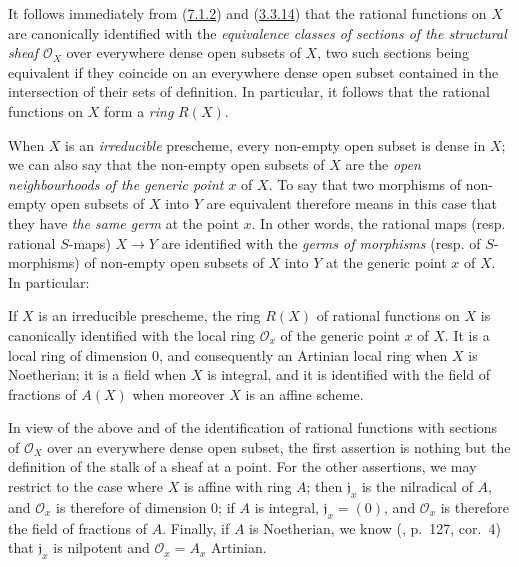 \begin{env}[7.1.3]
\label{I.7.1.3}
It follows immediately from (\hyperref[I.7.1.2]{7.1.2}) and
(\hyperref[I.3.3.14]{3.3.14}) that the rational functions on $X$ are
canonically identified with the
\emph{equivalence classes of sections of the structural sheaf
$\mathscr{O}_X$} over everywhere dense open subsets of $X$, two such sections
being equivalent if they coincide on an everywhere dense open subset contained
in the intersection of their sets of definition. In particular, it follows
that the rational functions on $X$ form a
\emph{ring} $R(X)$.
\end{env}

\begin{env}[7.1.4]
\label{I.7.1.4}
When $X$ is an \emph{irreducible} prescheme, every non-empty open subset is
dense in $X$; we can also say that the non-empty open subsets of $X$ are the
\emph{open neighbourhoods of the generic point $x$} of $X$. To say that two
morphisms of non-empty open subsets of $X$ into $Y$ are equivalent therefore
means in this case that they have \emph{the same germ} at the point $x$. In
other words, the rational maps (resp. rational $S$-maps)
$X\to Y$ are identified with the \emph{germs of morphisms} (resp. of
$S$-morphisms) of non-empty open subsets of $X$ into $Y$ at the generic point
$x$ of $X$. In particular:
\end{env}

\begin{proposition}[7.1.5]
\label{I.7.1.5}
If $X$ is an irreducible prescheme, the ring $R(X)$ of rational functions
on $X$ is canonically identified with the local ring $\mathscr{O}_x$ of the
generic point $x$ of $X$. It is a local ring of dimension \textup{0}, and consequently
an Artinian local ring when $X$ is Noetherian; it is a field when $X$ is
integral, and it is identified with the field of fractions of $A(X)$ when
moreover $X$ is an affine scheme.
\end{proposition}

In view of the above and of the identification of rational functions with
sections of $\mathscr{O}_X$ over an everywhere dense open subset, the first
assertion is nothing but the definition of the stalk of a sheaf at a point.
For the other assertions, we may restrict to the case where $X$ is affine with
ring $A$; then $\mathfrak{j}_x$ is the nilradical of $A$, and $\mathscr{O}_x$
is therefore of dimension 0; if $A$ is integral, $\mathfrak{j}_x=(0)$, and
$\mathscr{O}_x$ is therefore the field of fractions of $A$. Finally, if $A$ is
Noetherian, we know (\cite{I-11}, p.~127, cor.~4) that $\mathfrak{j}_x$ is
nilpotent and $\mathscr{O}_x=A_x$ Artinian.

